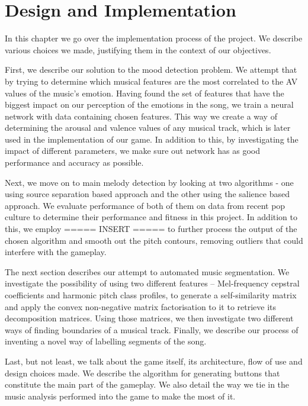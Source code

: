 
\chapter{Design and Implementation} 

\label{Chapter5} 


In this chapter we go over the implementation process of the project. We describe various choices we made, justifying them in the context of our objectives. 

First, we describe our solution to the mood detection problem. We attempt that by trying to determine which musical features are the most correlated to the AV values of the music's emotion. Having found the set of features that have the biggest impact on our perception of the emotions in the song, we train a neural network with data containing chosen features. This way we create a way of determining the arousal and valence values of any musical track, which is later used in the implementation of our game. In addition to this, by investigating the impact of different parameters, we make sure out network has as good performance and accuracy as possible.

Next, we move on to main melody detection by looking at two algorithms - one using source separation based approach and the other using the salience based approach. We evaluate performance of both of them on data from recent pop culture to determine their performance and fitness in this project. In addition to this, we employ ===== INSERT ===== to further process the output of the chosen algorithm and smooth out the pitch contours, removing outliers that could interfere with the gameplay.

The next section describes our attempt to automated music segmentation. We investigate the possibility of using two different features -- Mel-frequency cepstral coefficients and harmonic pitch class profiles, to generate a self-similarity matrix and apply the convex non-negative matrix factorisation to it to retrieve its decomposition matrices. Using those matrices, we then investigate two different ways of finding boundaries of a musical track. Finally, we describe our process of inventing a novel way of labelling segments of the song.

Last, but not least, we talk about the game itself, its architecture, flow of use and design choices made. We describe the algorithm for generating buttons that constitute the main part of the gameplay. We also detail the way we tie in the music analysis performed into the game to make the most of it.

